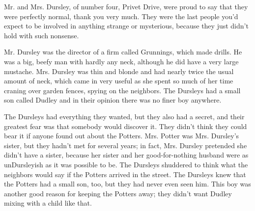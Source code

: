 \documentclass{article}
\begin{document}
Mr. and Mrs. Dursley, of number four, Privet Drive, were proud to say that they were perfectly normal, thank you very much. They were the last people you'd expect to be involved in anything strange or mysterious, because they just didn't hold with such nonsense.


Mr. Dursley was the director of a firm called Grunnings, which made drills. He was a big, beefy man with hardly any neck, although he did have a very large mustache. Mrs. Dursley was thin and blonde and had nearly twice the usual amount of neck, which came in very useful as she spent so much of her time craning over garden fences, spying on the neighbors. The Dursleys had a small son called Dudley and in their opinion there was no finer boy anywhere.


The Dursleys had everything they wanted, but they also had a secret, and their greatest fear was that somebody would discover it. They didn't think they could bear it if anyone found out about the Potters. Mrs. Potter was Mrs. Dursley's sister, but they hadn't met for several years; in fact, Mrs. Dursley pretended she didn't have a sister, because her sister and her good-for-nothing husband were as unDursleyish as it was possible to be. The Dursleys shuddered to think what the neighbors would say if the Potters arrived in the street. The Dursleys knew that the Potters had a small son, too, but they had never even seen him. This boy was another good reason for keeping the Potters away; they didn't want Dudley mixing with a child like that.
\end{document}
